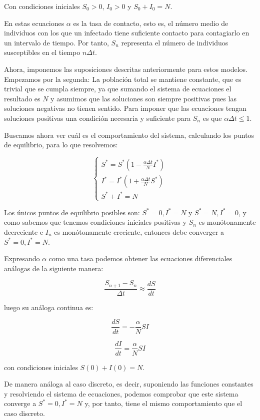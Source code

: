 Con condiciones iniciales $S_0>0$, $I_0>0$ y $S_0+I_0=N$.

En estas ecuaciones $\alpha$ es la tasa de contacto, esto es, el número medio de individuos con los que un infectado tiene suficiente contacto para contagiarlo en un intervalo de tiempo. Por tanto, $S_n$ representa el número de individuos susceptibles en el tiempo $n\Delta t$.

Ahora, imponemos las suposiciones descritas anteriormente para estos modelos. Empezamos por la segunda: La población total se mantiene constante, que es trivial que se cumpla siempre, ya que sumando el sistema de ecuaciones el resultado es $N$ y asumimos que las soluciones son siempre positivas pues las soluciones negativas no tienen sentido.
Para imponer que las ecuaciones tengan soluciones positivas una condición necesaria y suficiente para $S_n$ es que $\alpha\Delta t \leq 1$. 

Buscamos ahora ver cuál es el comportamiento del sistema, calculando los puntos de equilibrio, para lo que resolvemos:

$$
\begin{cases}
S^*=S^*\left( 1-\frac{\alpha\Delta t}{N}I^*\right) \\
I^*=I^*\left( 1+\frac{\alpha\Delta t}{N}S^*\right) \\
S^*+I^*=N
\end{cases}
$$

Los únicos puntos de equilibrio posibles son: $S^*=0, I^*=N$ y $S^*=N, I^*=0$, y como sabemos que tenemos condiciones iniciales positivas y $S_n$ es monótonamente decreciente e $I_n$ es monótonamente creciente, entonces debe converger a $S^*=0, I^*=N$.

Expresando $\alpha$ como una tasa podemos obtener las ecuaciones diferenciales análogas de la siguiente manera:

$$\frac{S_{n+1} - S_n}{\Delta t} \approx \frac{dS}{dt}$$

luego su análoga continua es:

\begin{equation}
\frac{dS}{dt} = -\frac{\alpha}{N}SI
\end{equation}


\begin{equation}
\frac{dI}{dt} = \frac{\alpha}{N}SI
\end{equation}

con condiciones iniciales $S(0)+I(0)=N$.

De manera análoga al caso discreto, es decir, suponiendo las funciones constantes y resolviendo el sistema de ecuaciones, podemos comprobar que este sistema converge a $S^*=0, I^*=N$ y, por tanto, tiene el mismo comportamiento que el caso discreto.

